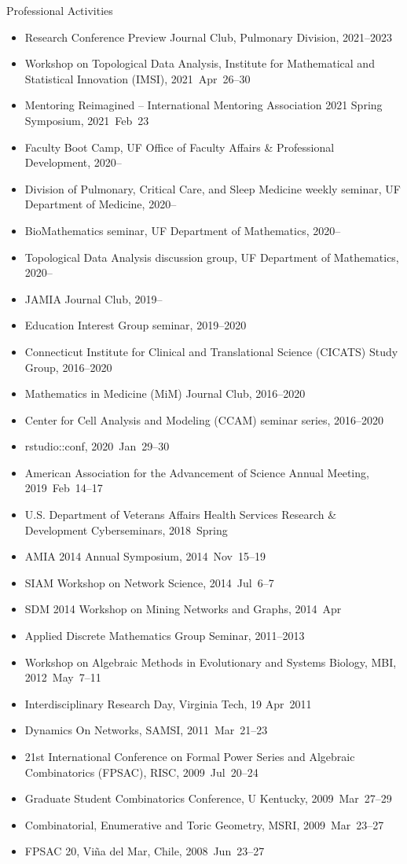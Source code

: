 \documentclass[10pt,a4paper]{article}
\begin{document}
\vspace{.25cm}
{\sc Professional Activities}
\begin{itemize}[label=$\circ$,nolistsep]
\item
Research Conference Preview Journal Club, Pulmonary Division, 2021--2023
\item
Workshop on Topological Data Analysis, Institute for Mathematical and Statistical Innovation (IMSI), 2021~Apr~26--30
\item
Mentoring Reimagined -- International Mentoring Association 2021 Spring Symposium, 2021~Feb~23
\item
Faculty Boot Camp, UF Office of Faculty Affairs \& Professional Development, 2020--
\item
Division of Pulmonary, Critical Care, and Sleep Medicine weekly seminar, UF Department of Medicine, 2020--
\item
BioMathematics seminar, UF Department of Mathematics, 2020--
\item
Topological Data Analysis discussion group, UF Department of Mathematics, 2020--
\item
JAMIA Journal Club, 2019--
\item
Education Interest Group seminar, 2019--2020
\item
Connecticut Institute for Clinical and Translational Science (CICATS) Study Group, 2016--2020
\item
Mathematics in Medicine (MiM) Journal Club, 2016--2020
\item
Center for Cell Analysis and Modeling (CCAM) seminar series, 2016--2020
\item
{\sffamily rstudio::conf}, 2020~Jan~29--30
\item
American Association for the Advancement of Science Annual Meeting, 2019~Feb~14--17
\item
U.S. Department of Veterans Affairs Health Services Research \& Development Cyberseminars, 2018~Spring
\item
AMIA 2014 Annual Symposium, 2014~Nov~15--19
\item
SIAM Workshop on Network Science, 2014~Jul~6--7
\item
SDM 2014 Workshop on Mining Networks and Graphs, 2014~Apr
\item
Applied Discrete Mathematics Group Seminar, 2011--2013
\item
Workshop on Algebraic Methods in Evolutionary and Systems Biology, MBI, 2012~May~7--11
\item
Interdisciplinary Research Day, Virginia Tech, 19 Apr~2011
\item
Dynamics On Networks, SAMSI, 2011~Mar~21--23
\item
21st International Conference on Formal Power Series and Algebraic Combinatorics (FPSAC), RISC, 2009~Jul~20--24
\item
Graduate Student Combinatorics Conference, U Kentucky, 2009~Mar~27--29
\item
Combinatorial, Enumerative and Toric Geometry, MSRI, 2009~Mar~23--27
\item
FPSAC 20, Vi\~{n}a del Mar, Chile, 2008~Jun~23--27
\end{itemize}
\end{document}

